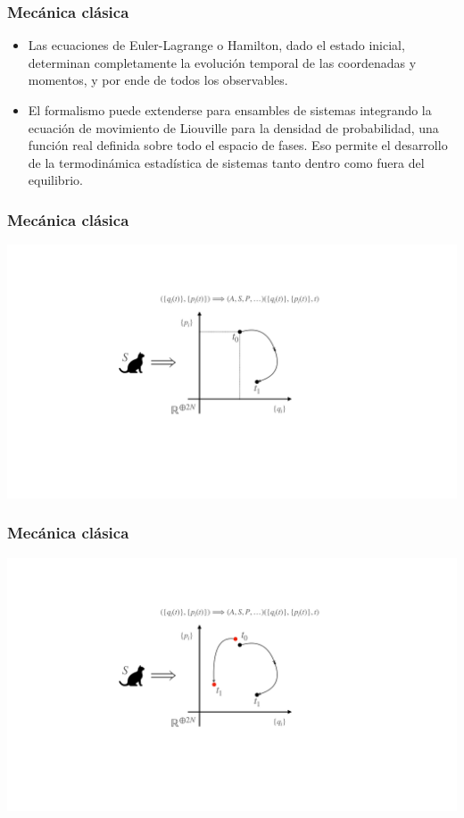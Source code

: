 \documentclass{beamer}
\begin{document}
\begin{frame}
    \frametitle{Mecánica clásica}
    \begin{itemize}
        \item Las ecuaciones de Euler-Lagrange o Hamilton, dado el estado inicial, determinan completamente la evolución temporal de las coordenadas y momentos, y por ende de todos los observables.
        \item El formalismo puede extenderse para ensambles de sistemas integrando la ecuación de movimiento de Liouville para la densidad de probabilidad, una función real definida sobre todo el espacio de fases. Eso permite el desarrollo de la termodinámica estadística de sistemas tanto dentro como fuera del equilibrio.
    \end{itemize}

\end{frame}

\begin{frame}
    \frametitle{Mecánica clásica}
    \begin{center}
        \includegraphics[scale=0.3]{figs/cats_02.pdf}
    \end{center}

\end{frame}

\begin{frame}
    \frametitle{Mecánica clásica}
    \begin{center}
        \includegraphics[scale=0.3]{figs/cats_03.pdf}
    \end{center}

\end{frame}
\end{document}
